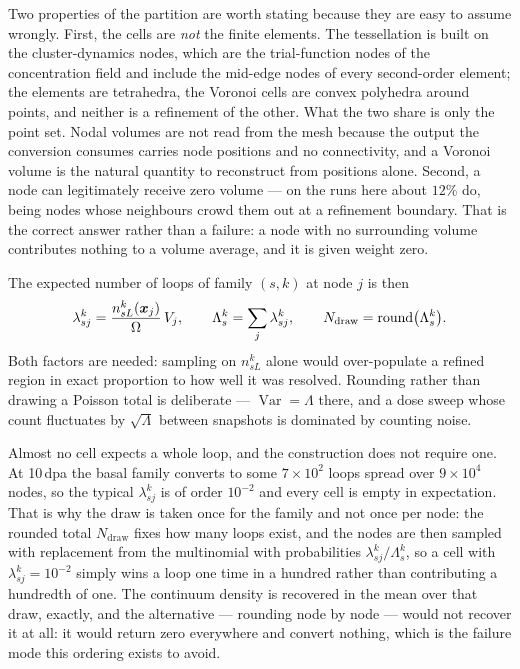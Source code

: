 Two properties of the partition are worth stating because they are easy to
assume wrongly. First, the cells are \emph{not} the finite elements. The
tessellation is built on the cluster-dynamics nodes, which are the trial-function
nodes of the concentration field and include the mid-edge nodes of every
second-order element; the elements are tetrahedra, the Voronoi cells are convex
polyhedra around points, and neither is a refinement of the other. What the two
share is only the point set. Nodal volumes are not read from the mesh because
the output the conversion consumes carries node positions and no connectivity,
and a Voronoi volume is the natural quantity to reconstruct from positions
alone. Second, a node can legitimately receive zero volume --- on the runs here
about $12\%$ do, being nodes whose neighbours crowd them out at a refinement
boundary. That is the correct answer rather than a failure: a node with no
surrounding volume contributes nothing to a volume average, and it is given
weight zero.

The expected number of loops of family $(s,k)$ at node $j$ is then
\begin{equation}
  \lambda^k_{sj}=\frac{n^k_{sL}(\bm{x}_j)}{\Omega}\,V_j,
  \qquad
  \Lambda^k_s=\sum_j\lambda^k_{sj},
  \qquad
  N_{\mathrm{draw}}=\operatorname{round}\bigl(\Lambda^k_s\bigr).
  \label{eq:counts}
\end{equation}
Both factors are needed: sampling on $n^k_{sL}$ alone would over-populate a
refined region in exact proportion to how well it was resolved. Rounding rather
than drawing a Poisson total is deliberate --- $\operatorname{Var}=\Lambda$
there, and a dose sweep whose count fluctuates by $\sqrt\Lambda$ between
snapshots is dominated by counting noise.

Almost no cell expects a whole loop, and the construction does not require one.
At 10\,dpa the basal family converts to some $7\times10^{2}$ loops spread over
$9\times10^{4}$ nodes, so the typical $\lambda^k_{sj}$ is of order $10^{-2}$ and
every cell is empty in expectation. That is why the draw is taken once for the
family and not once per node: the rounded total $N_{\mathrm{draw}}$ fixes how
many loops exist, and the nodes are then sampled with replacement from the
multinomial with probabilities $\lambda^k_{sj}/\Lambda^k_s$, so a cell with
$\lambda^k_{sj}=10^{-2}$ simply wins a loop one time in a hundred rather than
contributing a hundredth of one. The continuum density is recovered in the mean
over that draw, exactly, and the alternative --- rounding node by node --- would
not recover it at all: it would return zero everywhere and convert nothing,
which is the failure mode this ordering exists to avoid.

